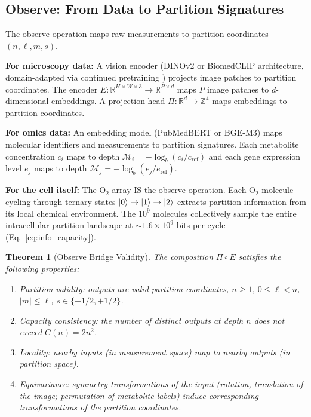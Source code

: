 \documentclass[twocolumn,10pt,a4paper]{article}
\newtheorem{theorem}{Theorem}[section]
\theoremstyle{definition}
\theoremstyle{remark}
\newcommand{\Depth}{\mathcal{M}}
\begin{document}
\subsection{Observe: From Data to Partition Signatures}

The observe operation maps raw measurements to partition coordinates $(n, \ell, m, s)$.

\textbf{For microscopy data:} A vision encoder (DINOv2 or BiomedCLIP architecture, domain-adapted via continued pretraining \citealp{Gururangan2020}) projects image patches to partition coordinates. The encoder $E: \mathbb{R}^{H \times W \times 3} \to \mathbb{R}^{P \times d}$ maps $P$ image patches to $d$-dimensional embeddings. A projection head $\Pi: \mathbb{R}^d \to \mathbb{Z}^4$ maps embeddings to partition coordinates.

\textbf{For omics data:} An embedding model (PubMedBERT \citep{Beltagy2019} or BGE-M3) maps molecular identifiers and measurements to partition signatures. Each metabolite concentration $c_i$ maps to depth $\Depth_i = -\log_b(c_i/c_{\mathrm{ref}})$ and each gene expression level $e_j$ maps to depth $\Depth_j = -\log_b(e_j/e_{\mathrm{ref}})$.

\textbf{For the cell itself:} The O$_2$ array IS the observe operation. Each O$_2$ molecule cycling through ternary states $\ket{0} \to \ket{1} \to \ket{2}$ extracts partition information from its local chemical environment. The $10^9$ molecules collectively sample the entire intracellular partition landscape at $\sim 1.6 \times 10^9$ bits per cycle (Eq.~\ref{eq:info_capacity}).

\begin{theorem}[Observe Bridge Validity]
\label{thm:bridge}
The composition $\Pi \circ E$ satisfies the following properties:
\begin{enumerate}[label=\textup{(\roman*)}]
    \item \textup{Partition validity:} outputs are valid partition coordinates, $n \geq 1$, $0 \leq \ell < n$, $|m| \leq \ell$, $s \in \{-1/2, +1/2\}$.
    \item \textup{Capacity consistency:} the number of distinct outputs at depth $n$ does not exceed $C(n) = 2n^2$.
    \item \textup{Locality:} nearby inputs (in measurement space) map to nearby outputs (in partition space).
    \item \textup{Equivariance:} symmetry transformations of the input (rotation, translation of the image; permutation of metabolite labels) induce corresponding transformations of the partition coordinates.
\end{enumerate}
\end{theorem}
\end{document}
